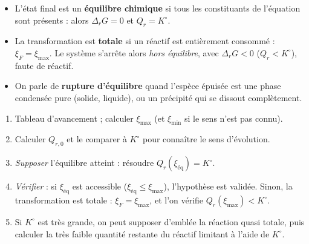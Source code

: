 \begin{definition}
\begin{itemize}
  \item L'état final est un \textbf{équilibre chimique} si tous les constituants de l'équation sont présents : alors $\Delta_rG = 0$ et $Q_r = K^\circ$.
  \item La transformation est \textbf{totale} si un réactif est entièrement consommé : $\xi_F = \xi_{\max}$. Le système s'arrête alors \emph{hors équilibre}, avec $\Delta_rG < 0$ ($Q_r < K^\circ$), faute de réactif.
  \item On parle de \textbf{rupture d'équilibre} quand l'espèce épuisée est une phase condensée pure (solide, liquide), ou un précipité qui se dissout complètement.
\end{itemize}
\end{definition}

\begin{methode}
\begin{enumerate}
  \item Tableau d'avancement ; calculer $\xi_{\max}$ (et $\xi_{\min}$ si le sens n'est pas connu).
  \item Calculer $Q_{r,0}$ et le comparer à $K^\circ$ pour connaître le sens d'évolution.
  \item \emph{Supposer} l'équilibre atteint : résoudre $Q_r(\xi_{\text{éq}}) = K^\circ$.
  \item \emph{Vérifier} : si $\xi_{\text{éq}}$ est accessible ($\xi_{\text{éq}}\leq\xi_{\max}$), l'hypothèse est validée. Sinon, la transformation est totale : $\xi_F = \xi_{\max}$, et l'on vérifie $Q_r(\xi_{\max}) < K^\circ$.
  \item Si $K^\circ$ est très grande, on peut supposer d'emblée la réaction quasi totale, puis calculer la très faible quantité restante du réactif limitant à l'aide de $K^\circ$.
\end{enumerate}
\end{methode}

